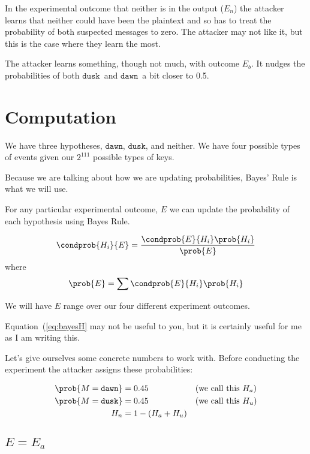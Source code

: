 \documentclass{article}
\newcommand\mdusk{\ensuremath{\mathtt{dusk}}}
\newcommand\mdawn{\ensuremath{\mathtt{dawn}}}
\begin{document}
In the experimental outcome that neither is in the output ($E_n$) the attacker learns
that neither could have been the plaintext and so has to treat the probability of both suspected messages to zero. The attacker may not like it, but this is the case where they learn the most.

The attacker learns something, though not much, with outcome $E_b$.
It nudges the probabilities of both \mdusk\ and \mdawn\ a bit closer to 0.5.

\section{Computation}

We have three hypotheses, \mdawn, \mdusk, and neither.
We have four possible types of events given our $2^{111}$ possible types of keys.

Because we are talking about how we are updating probabilities, Bayes' Rule is what we will use.

For any particular experimental outcome, $E$ we can update the probability of each hypothesis using Bayes Rule.

\begin{equation}\label{eq:bayesH}
    \condprob{H_i}{E} = \frac{\condprob{E}{H_i}\prob{H_i}}{\prob{E}}
\end{equation}
where
\begin{equation}\label{eq:ProbE}
    \prob{E} = \sum \condprob{E}{H_i}\prob{H_i}
\end{equation}

We will have $E$ range over our four different experiment outcomes.

Equation~(\ref{eq:bayesH} may not be useful to you, but it is certainly useful for me as I am writing this.

Let's give ourselves some concrete numbers to work with.
Before conducting the experiment the attacker assigns these probabilities:

\begin{align*}
    \prob{M = \mdawn} &= 0.45 && \text{(we call this $H_a$)} \\
    \prob{M = \mdusk} &= 0.45  && \text{(we call this $H_u$)} \\
    H_n & = 1 - (H_a + H_u) 
\end{align*}

\subsection{\(E = E_a\)}
\end{document}
